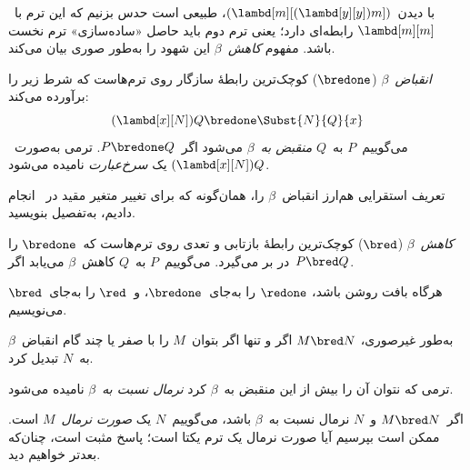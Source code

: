\documentclass[../../../include/open-logic-section]{subfiles}
\begin{document}

با دیدن~$(\lambd[m][(\lambd[y][y]) m])$، طبیعی است حدس بزنیم که این
ترم با~$\lambd[m][m]$ رابطه‌ای دارد؛ یعنی ترم دوم باید حاصل «ساده‌سازی»
ترم نخست باشد. مفهوم \emph{کاهش~$\beta$} این شهود را به‌طور صوری بیان
می‌کند.

\begin{defn} 
  \emph{انقباض~$\beta$} ($\bredone$) کوچک‌ترین رابطهٔ سازگار روی ترم‌هاست
  که شرط زیر را برآورده می‌کند:
  \[
    (\lambd[x][N])Q \bredone \Subst{N}{Q}{x} 
  \]
  می‌گوییم~$P$ به~$Q$ \emph{منقبض به~$\beta$} می‌شود اگر~$P \bredone Q$.
  ترمی به‌صورت~$(\lambd[x][N])Q$ یک \emph{سرخ‌عبارت} نامیده می‌شود.
\end{defn}

\begin{prob} 
  تعریف استقرایی هم‌ارز انقباض~$\beta$ را، همان‌گونه که برای تغییر متغیر
  مقید در~ انجام دادیم، به‌تفصیل
  بنویسید.
\end{prob}
  
\begin{defn} 
  \emph{کاهش~$\beta$} ($\bred$) کوچک‌ترین رابطهٔ بازتابی و تعدی روی
  ترم‌هاست که~$\bredone$ را در بر می‌گیرد. می‌گوییم~$P$ به~$Q$
  کاهش~$\beta$ می‌یابد اگر~$P \bred Q$.
\end{defn}

هرگاه بافت روشن باشد، $\redone$ را به‌جای~$\bredone$، و~$\red$ را
به‌جای~$\bred$ می‌نویسیم.

به‌طور غیرصوری، $M \bred N$ اگر و تنها اگر بتوان~$M$ را با صفر یا چند
گام انقباض~$\beta$ به~$N$ تبدیل کرد.

\begin{defn}
ترمی که نتوان آن را بیش از این منقبض به~$\beta$ کرد
\emph{نرمال نسبت به~$\beta$} نامیده می‌شود.
\end{defn}

اگر~$M \bred N$ و~$N$ نرمال نسبت به~$\beta$ باشد، می‌گوییم~$N$ یک
\emph{صورت نرمال}~$M$ است. ممکن است بپرسیم آیا صورت نرمال یک ترم یکتا
است؛ پاسخ مثبت است، چنان‌که بعدتر خواهیم دید.
\end{document}
